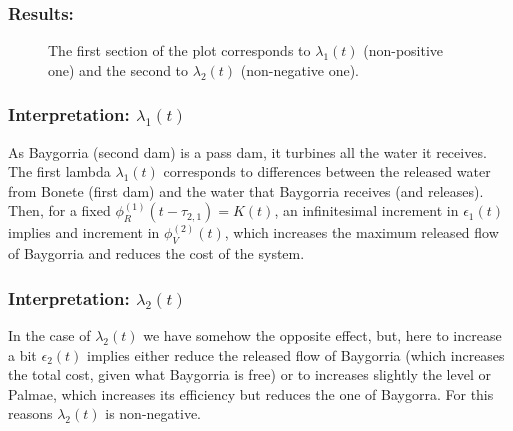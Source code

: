 \documentclass[aspectratio=169]{beamer}\usepackage[utf8]{inputenc}
\begin{document}
\begin{frame}\frametitle{Results:}
\begin{figure}[ht!]
\centering
{}
\caption{The first section of the plot corresponds to $\lambda_1(t)$ (non-positive one) and the second to $\lambda_2(t)$ (non-negative one).}
\end{figure}
\end{frame}

\begin{frame}\frametitle{Interpretation: $\lambda_1(t)$}
As Baygorria (second dam) is a pass dam, it turbines all the water it receives. The first lambda $\lambda_1(t)$ corresponds to differences between the released water from Bonete (first dam) and the water that Baygorria receives (and releases).\\
Then, for a fixed $\phi_R^{(1)}(t-\tau_{2,1})=K(t)$, an infinitesimal increment in $\epsilon_1(t)$ implies and increment in $\phi_V^{(2)}(t)$, which increases the maximum released flow of Baygorria and reduces the cost of the system.
\end{frame}

\begin{frame}\frametitle{Interpretation: $\lambda_2(t)$}
In the case of $\lambda_2(t)$ we have somehow the opposite effect, but, here to increase a bit $\epsilon_2(t)$ implies either reduce the released flow of Baygorria (which increases the total cost, given what Baygorria is free) or to increases slightly the level or Palmae, which increases its efficiency but reduces the one of Baygorra. For this reasons $\lambda_2(t)$ is non-negative.
\end{frame}
\end{document}
